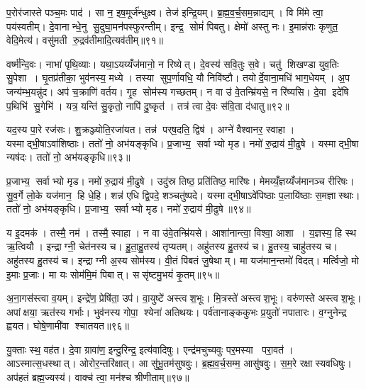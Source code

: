 प॒रोर॑जास्ते पञ्च॒मः पाद॑। सा न॒ इष॒मूर्ज॑न्धुक्ष्व। तेज॑ इन्द्रि॒यम्। ब्र॒ह्म॒व॒र्च॒सम॒न्नाद्यम्। वि मि॑मे त्वा॒ पय॑स्वतीम्। दे॒वानान्धे॒नु सु॒दुघा॒मन॑पस्फुरन्तीम्। इन्द्र॒ सोमं॑ पिबतु। क्षेमो॑ अस्तु नः। इ॒मान्न॑राः कृणुत॒ वेदि॒मेत्य॑। वसु॑मती रु॒द्रव॑तीमादि॒त्यव॑तीम्॥९१॥

वर्ष्म॑न्दि॒वः। नाभा॑ पृथि॒व्याः। यथा॒ऽयय्यँज॑मानो॒ न रिष्येत्। दे॒वस्य॑ सवि॒तुः स॒वे। चतु॑ शिखण्डा युव॒तिः सु॒पेशा। घृ॒तप्र॑तीका॒ भुव॑नस्य॒ मध्ये। तस्या सुप॒र्णावधि॒ यौ निवि॑ष्टौ। तयोर्दे॒वाना॒मधि॑ भाग॒धेयम्। अ॒प जन्य॑म्भ॒यन्नु॑द। अप॑ च॒क्राणि॑ वर्तय। गृ॒ह सोम॑स्य गच्छतम्। न वा उ॑ वे॒तन्म्रि॑यसे॒ न रि॑ष्यसि। दे॒वा इदे॑षि प॒थिभि॑ सु॒गेभि॑। यत्र॒ यन्ति॑ सु॒कृतो॒ नापि॑ दु॒ष्कृत॑। तत्र॑ त्वा दे॒वः स॑वि॒ता द॑धातु॥९२॥\anuvakamend[ब्रह्म॑णो॒ योनि॒रह॑सः प॒ङ्क्तिं प्रप॑द्ये दी॒क्षा यया॑ऽऽदि॒त्यो दी॒क्षया॑ दीक्षि॒तस्तया त्वा दी॒क्षया॑ दीक्षया॒म्योष॑धयो दी॒क्षा द्यौस्त्वा॒ दीक्ष॑माण॒मनु॑ दीक्षता॒मप॑चिति॒श्चाक्षि॑ति॒रुत्त॑रस्मिन्गमेयं॒ दिश॒ पाद॑ आदि॒त्यव॑तीं वर्तय॒ पञ्च॑ च]

यद॒स्य पा॒रे रज॑सः। शु॒क्रञ्ज्योति॒रजा॑यत। तन्न॑ पर्‌ष॒दति॒ द्विष॑। अग्ने॑ वैश्वानर॒ स्वाहा। यस्माद्भी॒षाऽवा॑शिष्ठाः। ततो॑ नो॒ अभ॑यङ्कृधि। प्र॒जाभ्य॒ सर्वाभ्यो मृड। नमो॑ रु॒द्राय॑ मी॒ढुषे। यस्माद्भी॒षा न्यष॑दः। ततो॑ नो॒ अभ॑यङ्कृधि॥९३॥

प्र॒जाभ्य॒ सर्वाभ्यो मृड। नमो॑ रु॒द्राय॑ मी॒ढुषे। उदु॑स्र तिष्ठ॒ प्रति॑तिष्ठ॒ मारि॑षः। मेमय्यँ॒ज्ञय्यँज॑मानञ्च रीरिषः। सु॒व॒र्गे लो॒के यज॑मान॒ हि धे॒हि। शन्न॑ एधि द्वि॒पदे॒ शञ्चतु॑ष्पदे। यस्माद्भी॒षाऽवे॑पिष्ठाः प॒लायि॑ष्ठाः स॒मज्ञास्थाः। ततो॑ नो॒ अभ॑यङ्कृधि। प्र॒जाभ्य॒ सर्वाभ्यो मृड। नमो॑ रु॒द्राय॑ मी॒ढुषे॥९४॥

य इ॒दमक॑। तस्मै॒ नम॑। तस्मै॒ स्वाहा। न वा उ॑वे॒तन्म्रि॑यसे। आशा॑नान्त्वा॒ विश्वा॒ आशा। य॒ज्ञस्य॒ हि स्थ ऋ॒त्वियौ। इन्द्राग्नी॒ चेत॑नस्य च। हु॒ता॒हु॒तस्य॑ तृप्यतम्। अहु॑तस्य हु॒तस्य॑ च। हु॒तस्य॒ चाहु॑तस्य च। अहु॑तस्य हु॒तस्य॑ च। इन्द्राग्नी अ॒स्य सोम॑स्य। वी॒तं पि॑बतं जु॒षेथाम्। मा यज॑मान॒न्तमो॑ विदत्। मर्त्विजो॒ मो इ॒माः प्र॒जाः। मा यः सोम॑मि॒मं पिबात्। ससृ॑ष्टमु॒भयं॑ कृ॒तम्॥९५॥\anuvakamend[कृ॒धि॒ मी॒ढुषेऽहु॑तस्य च स॒प्त च॑]

अ॒ना॒गस॑स्त्वा व॒यम्। इन्द्रे॑ण॒ प्रेषि॑ता॒ उप॑। वा॒युष्टे॑ अस्त्वश॒भूः। मि॒त्रस्ते॑ अस्त्वश॒भूः। वरु॑णस्ते अस्त्वश॒भूः। अपांक्षया॒ ऋत॑स्य गर्भाः। भुव॑नस्य गोपा॒ श्येना॑ अतिथयः। पर्व॑तानाङ्ककुभः प्र॒युतो॑ नपातारः। व॒ग्नुनेन्द्र ह्वयत। घोषे॒णामी॑वा श्चातयत॥९६॥

यु॒क्ताः स्थ॒ वह॑त। दे॒वा ग्रावा॑ण॒ इन्दु॒रिन्द्र॒ इत्य॑वादिषुः। एन्द्र॑मचुच्यवुः पर॒मस्या परा॒वत॑। आऽस्मात्स॒धस्थात्। ओरोर॒न्तरि॑क्षात्। आ सु॑भू॒तम॑सुषवुः। ब्र॒ह्म॒व॒र्च॒सम्म॒ आसु॑षवुः। स॒म॒रे रक्षास्यवधिषुः। अप॑हतं ब्रह्म॒ज्यस्य॑। वाक्च॑ त्वा॒ मन॑श्च श्रीणीताम्॥९७॥

